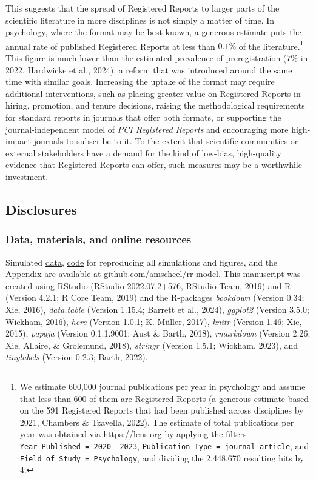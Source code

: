 \documentclass[
  ,man,mask,floatsintext]{apa6}
\begin{document}
This suggests that the spread of Registered Reports to larger parts of the scientific literature in more disciplines is not simply a matter of time.
In psychology, where the format may be best known, a generous estimate puts the annual rate of published Registered Reports at less than \(0.1\%\) of the literature.\footnote{We estimate 600,000 journal publications per year in psychology and assume that less than 600 of them are Registered Reports (a generous estimate based on the 591 Registered Reports that had been published across disciplines by 2021, Chambers \& Tzavella, 2022). The estimate of total publications per year was obtained via \url{https://lens.org} by applying the filters \texttt{Year\ Published\ =\ 2020-\/-2023}, \texttt{Publication\ Type\ =\ journal\ article}, and \texttt{Field\ of\ Study\ =\ Psychology}, and dividing the 2,448,670 resulting hits by 4.}
This figure is much lower than the estimated prevalence of preregistration (\(7\%\) in 2022, Hardwicke et al., 2024), a reform that was introduced around the same time with similar goals.
Increasing the uptake of the format may require additional interventions, such as placing greater value on Registered Reports in hiring, promotion, and tenure decisions, raising the methodological requirements for standard reports in journals that offer both formats, or supporting the journal-independent model of \emph{PCI Registered Reports} and encouraging more high-impact journals to subscribe to it.
To the extent that scientific communities or external stakeholders have a demand for the kind of low-bias, high-quality evidence that Registered Reports can offer, such measures may be a worthwhile investment.

\hypertarget{disclosures}{%
\subsection{Disclosures}\label{disclosures}}

\hypertarget{data-materials-and-online-resources}{%
\subsubsection{Data, materials, and online resources}\label{data-materials-and-online-resources}}

Simulated \href{https://github.com/amscheel/rr-model/tree/master/data}{data}, \href{https://github.com/amscheel/rr-model/tree/master/code}{code} for reproducing all simulations and figures, and the \href{https://github.com/amscheel/rr-model/blob/master/appendix/rr-risk-sensitivity_appendix.pdf}{Appendix} are available at \href{https://github.com/amscheel/rr-model}{github.com/amscheel/rr-model}.
This manuscript was created using RStudio (RStudio 2022.07.2+576, RStudio Team, 2019) and R (Version 4.2.1; R Core Team, 2019) and the R-packages \emph{bookdown} (Version 0.34; Xie, 2016), \emph{data.table} (Version 1.15.4; Barrett et al., 2024), \emph{ggplot2} (Version 3.5.0; Wickham, 2016), \emph{here} (Version 1.0.1; K. Müller, 2017), \emph{knitr} (Version 1.46; Xie, 2015), \emph{papaja} (Version 0.1.1.9001; Aust \& Barth, 2018), \emph{rmarkdown} (Version 2.26; Xie, Allaire, \& Grolemund, 2018), \emph{stringr} (Version 1.5.1; Wickham, 2023), and \emph{tinylabels} (Version 0.2.3; Barth, 2022).
\end{document}
